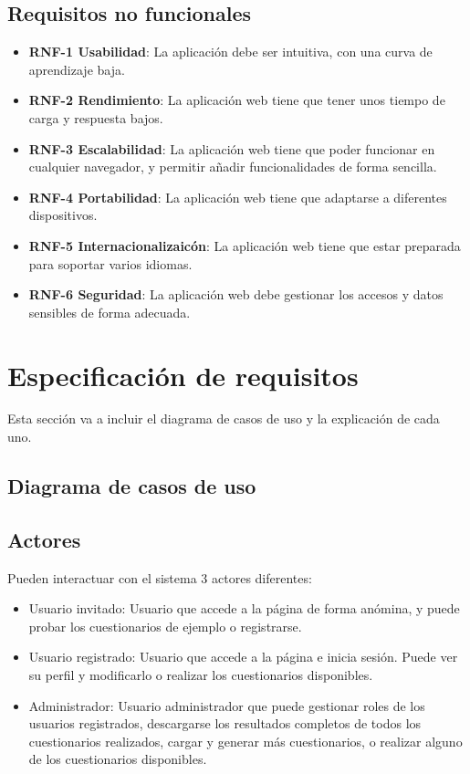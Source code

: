 \subsection{Requisitos no funcionales}
\begin{itemize}
	\item \textbf{RNF-1 Usabilidad}: La aplicación debe ser intuitiva, con una curva de aprendizaje baja.
	\item \textbf{RNF-2 Rendimiento}: La aplicación web tiene que tener unos tiempo de carga y respuesta bajos.
	\item \textbf{RNF-3 Escalabilidad}: La aplicación web tiene que poder funcionar en cualquier navegador, y permitir añadir funcionalidades de forma sencilla.
	\item \textbf{RNF-4 Portabilidad}: La aplicación web tiene que adaptarse a diferentes dispositivos.
	\item \textbf{RNF-5 Internacionalizaicón}: La aplicación web tiene que estar preparada para soportar varios idiomas.
	\item \textbf{RNF-6 Seguridad}: La aplicación web debe gestionar los accesos y datos sensibles de forma adecuada.
\end{itemize}

\section{Especificación de requisitos}

Esta sección va a incluir el diagrama de casos de uso y la explicación de cada uno.

\begin{landscape}
\subsection{Diagrama de casos de uso}
\end{landscape}

\subsection{Actores}

Pueden interactuar con el sistema 3 actores diferentes:

\begin{itemize}
	\item Usuario invitado: Usuario que accede a la página de forma anómina, y puede probar los cuestionarios de ejemplo o registrarse.  
	\item Usuario registrado: Usuario que accede a la página e inicia sesión. Puede ver su perfil y modificarlo o realizar los cuestionarios disponibles.
	\item Administrador: Usuario administrador que puede gestionar roles de los usuarios registrados, descargarse los resultados completos de todos los cuestionarios realizados, cargar y generar más cuestionarios, o realizar alguno de los cuestionarios disponibles.
\end{itemize}

